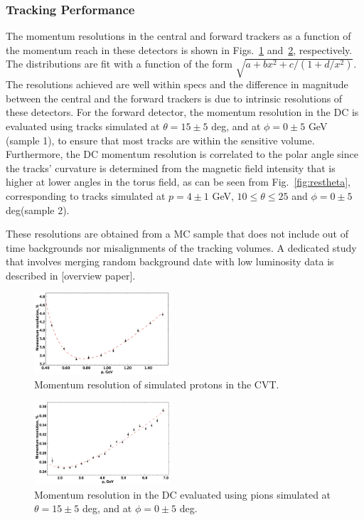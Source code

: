 \subsubsection{Tracking Performance}

The momentum resolutions in the central and forward trackers as a function of the momentum reach
in these detectors is shown in Figs.~\ref{fig:respcvt} and~\ref{fig:respdc}, respectively.  The distributions are fit with a function of the form $\sqrt{a+b x^{2}+c/(1+d/x^{2})}$.  The resolutions achieved are well within specs and the difference in magnitude between the central and the forward trackers is due to intrinsic resolutions of these detectors.  For the forward detector, the momentum resolution in the DC is evaluated using  tracks simulated at $\theta =15\pm 5$ deg, and at $\phi = 0 \pm 5$ GeV (sample 1), to ensure that most tracks are within the sensitive volume.
Furthermore, the DC momentum resolution is correlated to the polar angle since the tracks' curvature is determined from the magnetic field intensity that is higher at lower angles in the torus field, as can be seen from Fig.~\ref{fig:restheta}, corresponding to tracks simulated at $p=4\pm 1$ GeV, $10\leq \theta\leq 25$ and $\phi = 0 \pm 5$ deg(sample 2).

These resolutions are obtained from a MC sample that does not include out of time backgrounds nor misalignments of the tracking volumes.   
A dedicated study that involves merging random background date with low luminosity data is described in [overview paper].

\begin{figure}
\includegraphics[width=0.45\textwidth]{pics/fddegipekmpjjiho.png}
\caption{Momentum resolution of simulated protons in the CVT.  
}
\label{fig:respcvt}
\end{figure}
\begin{figure}
\includegraphics[width=0.45\textwidth]{pics/DCRes.png}
\caption{Momentum resolution in the DC evaluated using pions  simulated at $\theta =15\pm 5$ deg, and at $\phi = 0 \pm 5$ deg.
}
\label{fig:respdc}
\end{figure}


